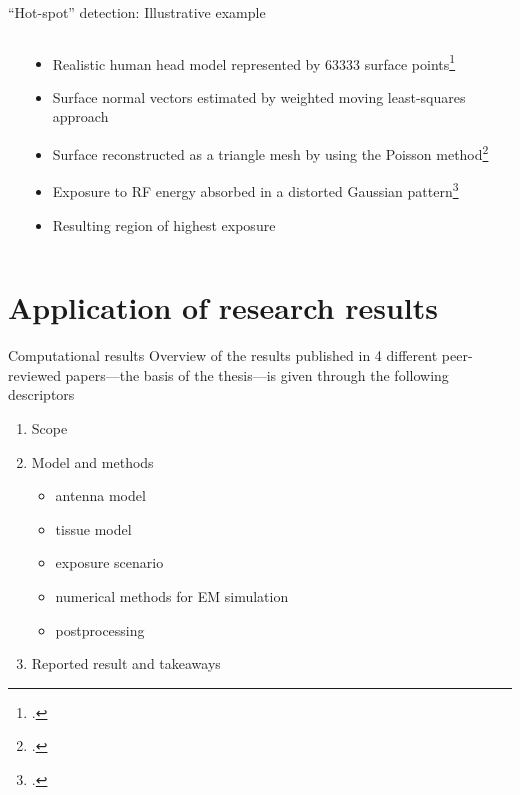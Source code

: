 \documentclass[xcolor=dvipsnames,10pt]{beamer}
\begin{document}
\begin{frame}{``Hot-spot'' detection: Illustrative example}
\begin{columns}[c]
\begin{column}{0.4\textwidth}
\begin{onlyenv}
\begin{center}
                \end{center}
            \end{onlyenv}
        \end{column} 
        \begin{column}{0.6\textwidth}
            \begin{itemize}
                \item<1> Realistic human head model represented by \num{63333} surface points\footcite{Laakso2015Intersubject}
                \item<2> Surface normal vectors estimated by weighted moving least-squares approach
                \item<3> Surface reconstructed as a triangle mesh by using the Poisson method\footcite{Kazhdan2006Poisson}
                \item<4> Exposure to RF energy absorbed in a distorted Gaussian pattern\footcite{Kapetanovic2023Automatic}
                \item<5> Resulting region of highest exposure
            \end{itemize}
        \end{column}
    \end{columns} 
\end{frame}

\section{Application of research results}
\begin{frame}{Computational results}
    Overview of the results published in \num{4} different peer-reviewed papers---the basis of the thesis---is given through the following descriptors
    \begin{enumerate}
        \item Scope
        \item Model and methods
        \begin{itemize}
            \item antenna model
            \item tissue model
            \item exposure scenario
            \item numerical methods for EM simulation
            \item postprocessing
        \end{itemize}
        \item Reported result and takeaways
        \end{enumerate}
\end{frame}
\end{document}
